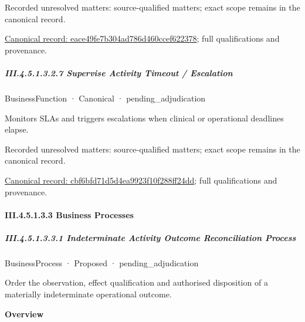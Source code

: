 {\small Recorded unresolved matters: source-qualified matters; exact scope remains in the canonical record.}\par
{\footnotesize \href{../../../../continuum/business/business-function/eace49fe7b304ad786d460ccef622378.md}{Canonical record: eace49fe7b304ad786d460ccef622378}; full qualifications and provenance.}\par
\subparagraph*{III.4.5.1.3.2.7 Supervise Activity Timeout / Escalation}
\label{navigation:III.4.5.1.3.2.7}

\label{element:cbf6bfd71d5d4ea9923f10f288ff24dd}
{\small BusinessFunction · Canonical · pending\_adjudication}\par

Monitors SLAs and triggers escalations when clinical or operational deadlines elapse.


{\small Recorded unresolved matters: source-qualified matters; exact scope remains in the canonical record.}\par
{\footnotesize \href{../../../../continuum/business/business-function/cbf6bfd71d5d4ea9923f10f288ff24dd.md}{Canonical record: cbf6bfd71d5d4ea9923f10f288ff24dd}; full qualifications and provenance.}\par
\paragraph*{III.4.5.1.3.3 Business Processes}
\label{navigation:III.4.5.1.3.3}

\subparagraph*{III.4.5.1.3.3.1 Indeterminate Activity Outcome Reconciliation Process}
\label{navigation:III.4.5.1.3.3.1}

\label{element:96baf3721ce94397a11486184d3df7cf}
{\small BusinessProcess · Proposed · pending\_adjudication}\par

Order the observation, effect qualification and authorised disposition of a materially indeterminate operational outcome.



\textbf{Overview}



